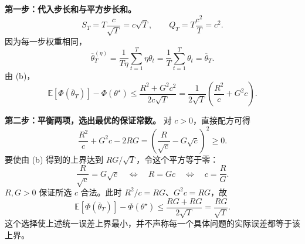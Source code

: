 \documentclass[UTF8,a4paper,11pt,fontset=fandol]{ctexart}
\newcommand{\E}{\mathbb E}
\begin{document}
\textbf{第一步：代入步长和与平方步长和。}
\[
 S_T=T\frac c{\sqrt T}=c\sqrt T,
 \qquad Q_T=T\frac{c^2}{T}=c^2.
\]
因为每一步权重相同，
\[
 \overline\theta_T^{(\eta)}
 =\frac1{T\eta}\sum_{t=1}^T\eta\theta_t
 =\frac1T\sum_{t=1}^T\theta_t=\overline\theta_T.
\]
由 (b)，
\[
 \E[\Phi(\overline\theta_T)]-\Phi(\theta^\star)
 \leq\frac{R^2+G^2c^2}{2c\sqrt T}
 =\frac1{2\sqrt T}\left(\frac{R^2}{c}+G^2c\right).
\]

\textbf{第二步：平衡两项，选出最优的保证常数。}
对 $c>0$，直接配方可得
\[
 \frac{R^2}{c}+G^2c-2RG
 =\left(\frac R{\sqrt c}-G\sqrt c\right)^2\geq0.
\]
要使由 (b) 得到的上界达到 $RG/\sqrt T$，令这个平方等于零：
\[
 \frac R{\sqrt c}=G\sqrt c
 \quad\Longleftrightarrow\quad R=Gc
 \quad\Longleftrightarrow\quad\boxed{c=\frac RG}.
\]
$R,G>0$ 保证所选 $c$ 合法。此时 $R^2/c=RG$、$G^2c=RG$，故
\[
 \boxed{\E[\Phi(\overline\theta_T)]-\Phi(\theta^\star)
 \leq\frac{RG+RG}{2\sqrt T}=\frac{RG}{\sqrt T}.}
\]
这个选择使上述统一误差上界最小，并不声称每一个具体问题的实际误差都等于该上界。
\end{document}
